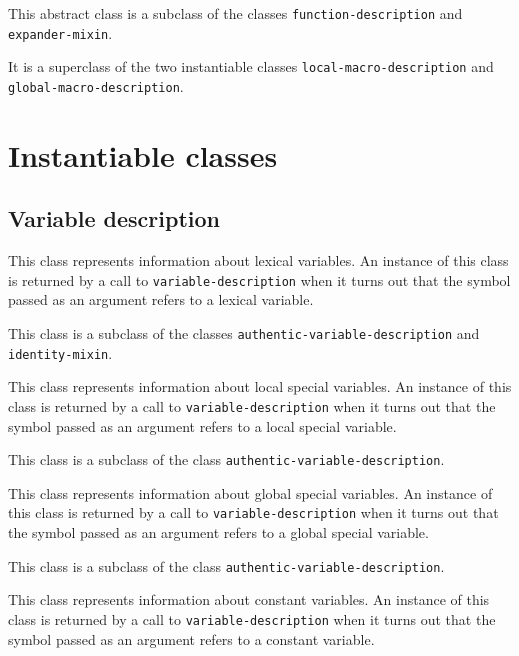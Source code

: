 {\footnotesize
{}
}

This abstract class is a subclass of the classes
\texttt{function-description} and \texttt{expander-mixin}.

It is a superclass of the two instantiable classes
\texttt{local-macro-description} and
\texttt{global-macro-description}.

\section{Instantiable classes}
\label{sec-instantiable-query-classes}

\subsection{Variable description}
\label{sec-instantiable-classes-variable-desciption}

{\footnotesize
{}
}

This class represents information about lexical variables.  An
instance of this class is returned by a call to \texttt{variable-description}
when it turns out that the symbol passed as an argument refers to a
lexical variable.

This class is a subclass of the classes
\texttt{authentic-variable-description} and \texttt{identity-mixin}.

{\footnotesize
{}
}

This class represents information about local special variables.   An
instance of this class is returned by a call to \texttt{variable-description}
when it turns out that the symbol passed as an argument refers to a
local special variable.

This class is a subclass of the class
\texttt{authentic-variable-description}.

{\footnotesize
{}
}

This class represents information about global special variables.   An
instance of this class is returned by a call to \texttt{variable-description}
when it turns out that the symbol passed as an argument refers to a
global special variable.

This class is a subclass of the class
\texttt{authentic-variable-description}.

{\footnotesize
{}
}

This class represents information about constant variables.   An
instance of this class is returned by a call to \texttt{variable-description}
when it turns out that the symbol passed as an argument refers to a
constant variable.

